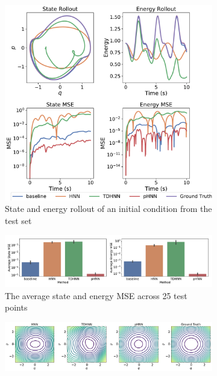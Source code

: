 \documentclass[twoside]{article}
\begin{document}
\begin{figure}[!htb]
\centering
\captionsetup{justification=centering}
\begin{subfigure}[b]{0.48\textwidth}
\includegraphics[width=\textwidth]{figures/figures/forced_mass_spring/1/forced_mass_spring_long_0.pdf}
\caption{State and energy rollout of an initial condition from the test set}
\end{subfigure}
\begin{subfigure}[b]{0.48\textwidth}
\includegraphics[width=\textwidth]{figures/figures/forced_mass_spring/1/forced_mass_spring_errors_0.pdf}
\caption{The average state and energy MSE across 25 test points}
\end{subfigure}
\begin{subfigure}[b]{0.48\textwidth}
\includegraphics[width=\textwidth]{figures/figures/forced_mass_spring/1/forced_mass_spring_hamiltonian_0.pdf}

\end{subfigure}
\end{figure}
\end{document}
